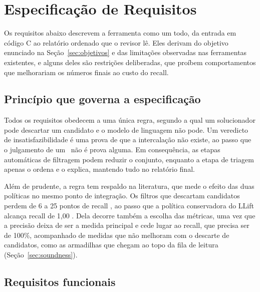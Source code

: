 \chapter{Especificação de Requisitos} \label{cap:especificacao}

Os requisitos abaixo descrevem a ferramenta como um todo, da entrada em código
C ao relatório ordenado que o revisor lê. Eles derivam do objetivo enunciado na
Seção~\ref{sec:objetivos} e das limitações observadas nas ferramentas
existentes, e alguns deles são restrições deliberadas, que proíbem
comportamentos que melhorariam os números finais ao custo do recall.

\section{Princípio que governa a especificação}
\label{sec:principio}

Todos os requisitos obedecem a uma única regra, segundo a qual um solucionador
pode descartar um candidato e o modelo de linguagem não pode. Um veredicto de
insatisfazibilidade é uma prova de que a intercalação não existe, ao passo que
o julgamento de um \llm\ não é prova alguma. Em consequência, as etapas automáticas de filtragem
podem reduzir o conjunto, enquanto a etapa de triagem apenas o ordena e o
explica, mantendo tudo no relatório final.

Além de prudente, a regra tem respaldo na literatura, que mede o efeito das duas
políticas no mesmo ponto de integração. Os filtros que descartam candidatos
perdem de 6 a 25 pontos de recall \cite{reducing-fp,adataint}, ao passo que a
política conservadora do LLift alcança recall de 1,00 \cite{llift}. Dela decorre
também a escolha das métricas, uma vez que a precisão deixa de ser a medida
principal e cede lugar ao recall, que precisa ser de 100\%, acompanhado de
medidas que não melhoram com o descarte de candidatos, como as armadilhas que
chegam ao topo da fila de leitura (Seção~\ref{sec:soundness}).

\section{Requisitos funcionais}
\label{sec:rf}

